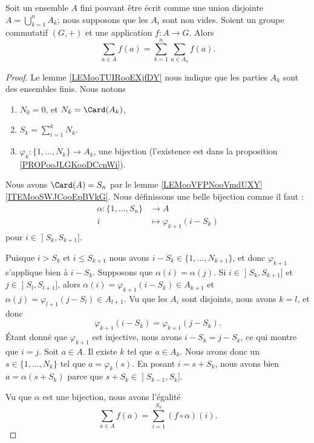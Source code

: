 \begin{lemma}		\label{LEMooNDBYooAGEkmw}
	Soit un ensemble \( A\) fini pouvant être écrit comme une union disjointe \( A=\bigcup_{k=1}^nA_k\); nous supposons que les \( A_i\) sont non vides. Soient un groupe commutatif \( (G,+)\) et une application \( f\colon A\to G\). Alors
	\begin{equation}
		\sum_{a\in A}f(a)=\sum_{k=1}^n\sum_{a\in A_k}f(a).
	\end{equation}
\end{lemma}


\begin{proof}
	Le lemme \ref{LEMooTUIRooEXjfDY} nous indique que les parties \( A_k\) sont des ensembles finis. Nous notons
	\begin{enumerate}
		\item
		      \( N_0=0\), et \( N_k=\Card(A_k)\),
		\item
		      \( S_k=\sum_{i=1}^kN_k\).
		\item
		      \( \varphi_k\colon \{ 1,\ldots, N_k \}\to A_k\), une bijection (l'existence est dans la proposition \ref{PROPooJLGKooDCcnWi}).
	\end{enumerate}
	Nous avons \( \Card(A)=S_n\) par le lemme \ref{LEMooVFPNooVmdUXY}\ref{ITEMooSWJCooEpBVkG}. Nous définissons une belle bijection comme il faut :
	\begin{equation}
		\begin{aligned}
			\alpha\colon \{ 1,\ldots, S_n \} & \to A                        \\
			i                                & \mapsto \varphi_{k+1}(i-S_k)
		\end{aligned}
	\end{equation}
	pour \( i\in\mathopen] S_k , S_{k+1} \mathclose]\).

	\begin{subproof}
		Puisque \( i>S_k\) et \( i\leq S_{k+1}\) nous avons \( i-S_k\in \{ 1,\ldots, N_{k+1} \}\), et donc \( \varphi_{k+1}\) s'applique bien à \( i-S_k\).
		Supposons que \( \alpha(i)=\alpha(j)\). Si \( i\in \mathopen] S_k , S_{k+1} \mathclose]\) et \( j\in \mathopen] S_l , S_{l+1} \mathclose]\), alors \( \alpha(i)=\varphi_{k+1}(i-S_k)\in A_{k+1}\) et \( \alpha(j)=\varphi_{l+1}(j-S_l)\in A_{l+1}\). Vu que les \( A_i\) sont disjoints, nous avons \( k=l\), et donc
		\begin{equation}
			\varphi_{k+1}(i-S_k)=\varphi_{k+1}(j-S_k).
		\end{equation}
		Étant donné que \( \varphi_{k+1}\) est injective, nous avons \( i-S_k=j-S_k\), ce qui montre que \( i=j\).
		Soit \( a\in A\). Il existe \( k\) tel que \( a\in A_k\). Nous avons donc un \( s\in\{ 1,\ldots, N_k \}\) tel que \( a=\varphi_k(s)\). En posant \( i=s+S_k\), nous avons bien \( a=\alpha(s+S_k)\) parce que \( s+S_k\in \mathopen] S_{k-1} , S_k \mathclose]\).
	\end{subproof}
	Vu que \( \alpha\) est une bijection, nous avons l'égalité
	\begin{equation}
		\sum_{a\in A}f(a)=\sum_{i=1}^{S_n}(f\circ \alpha)(i).
	\end{equation}


\end{proof}
